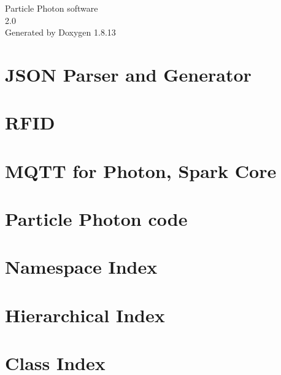 \documentclass[twoside]{book}
\newcommand{\+}{\discretionary{\mbox{\scriptsize$\hookleftarrow$}}{}{}}
\newcommand{\clearemptydoublepage}{%
  \newpage{\pagestyle{empty}\cleardoublepage}%
}
\begin{document}
\hypersetup{pageanchor=false,
             bookmarksnumbered=true,
             pdfencoding=unicode
            }
\begin{titlepage}
\vspace*{7cm}
\begin{center}%
{\Large Particle Photon software \\[1ex]\large 2.\+0 }\\
\vspace*{1cm}
{\large Generated by Doxygen 1.8.13}\\
\end{center}
\end{titlepage}
\clearemptydoublepage
{}
\tableofcontents
\clearemptydoublepage
{}
\hypersetup{pageanchor=true}

\chapter{J\+S\+ON Parser and Generator}
\label{md_lib__json_parser_generator_r_k__r_e_a_d_m_e}

\chapter{R\+F\+ID}
\label{md_lib__m_f_r_c522__r_e_a_d_m_e}

\chapter{M\+Q\+TT for Photon, Spark Core}
\label{md_lib__m_q_t_t__r_e_a_d_m_e}

\chapter{Particle Photon code}
\label{md__r_e_a_d_m_e}

\chapter{Namespace Index}

\chapter{Hierarchical Index}

\chapter{Class Index}

\end{document}
